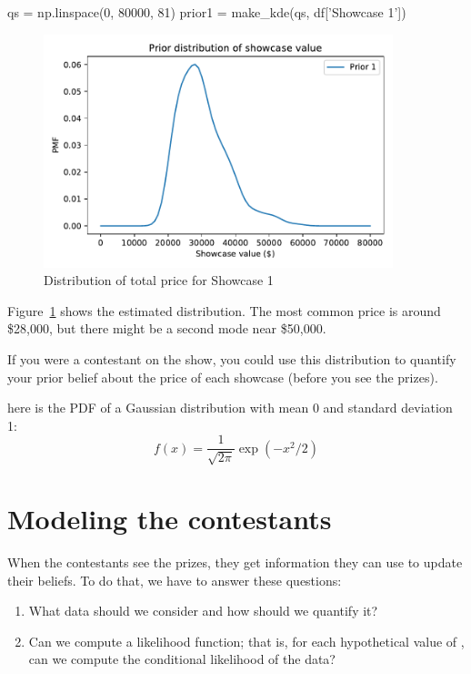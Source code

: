 \documentclass[12pt]{book}
\theoremstyle{exercise}
\begin{document}
\begin{code}
qs = np.linspace(0, 80000, 81)
prior1 = make_kde(qs, df['Showcase 1'])
\end{code}

\begin{figure}
\centerline{\includegraphics[width=4in]{figs/fig08-01.pdf}}
\caption{Distribution of total price for Showcase 1}
\label{fig08-01}
\end{figure}

Figure~\ref{fig08-01} shows the estimated distribution.  
The most common price is around
\$28,000, but there might be a second mode near \$50,000.

If you were a contestant on the
show, you could use this distribution to quantify your prior belief
about the price of each showcase (before you see the prizes).


here is the PDF of a Gaussian distribution with
mean 0 and standard deviation 1:
%
\[ f(x) = \frac{1}{\sqrt{2 \pi}} \exp(-x^2/2) \]
%





\section{Modeling the contestants}

When the contestants see the prizes, they get information they can use to update their beliefs.
To do that, we have to answer these questions:

\begin{enumerate}

\item What data should we consider and how should we quantify it?

\item Can we compute a likelihood function; that is,
  for each hypothetical value of , can we compute
  the conditional likelihood of the data?

\end{enumerate}
\end{document}
